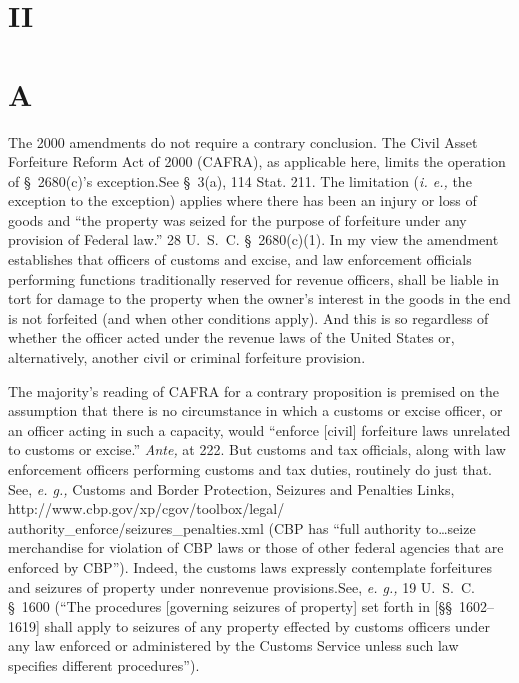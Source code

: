 \section{II}

\section{A}

  The 2000 amendments do not require a contrary conclusion. The Civil Asset Forfeiture Reform Act of 2000 (CAFRA), as applicable here, limits the operation of \S~2680(c)'s exception.See \S~3(a), 114 Stat. 211. The limitation (\emph{i. e.,} the exception to the exception) applies where there has been an injury or loss of goods and ``the property was seized for the purpose of forfeiture under any provision of Federal law.'' 28 U.~S.~C. \S~2680(c)(1). In my view the amendment establishes that officers of customs and excise, and law enforcement officials performing functions traditionally reserved for revenue officers, shall be liable in tort for damage to the property when the owner's interest in the goods in the end is not forfeited (and when other conditions apply). And this is so regardless of whether the officer acted under the revenue laws of the United States or, alternatively, another civil or criminal forfeiture provision.

  The majority's reading of CAFRA for a contrary proposition is premised on the assumption that there is no circumstance in which a customs or excise officer, or an officer acting in such a capacity, would ``enforce [civil] forfeiture laws unrelated to customs or excise.'' \emph{Ante,} at 222. But customs and tax officials, along with law enforcement officers performing customs and tax duties, routinely do just that. See, \emph{e. g.,} Customs and Border Protection, Seizures and Penalties Links, http://www.cbp.gov/xp/cgov/toolbox/legal/ authority_enforce/seizures_penalties.xml (CBP has ``full authority to\dots seize merchandise for violation of CBP laws or those of other federal agencies that are enforced by CBP''). Indeed, the customs laws expressly contemplate forfeitures and seizures of property under nonrevenue provisions.See, \emph{e. g.,} 19 U.~S.~C. \S~1600 (``The procedures [governing seizures of property] set forth in [\S\S~1602--1619] shall apply to seizures of any property effected by customs officers under any law \newpage  enforced or administered by the Customs Service unless such law specifies different procedures'').

